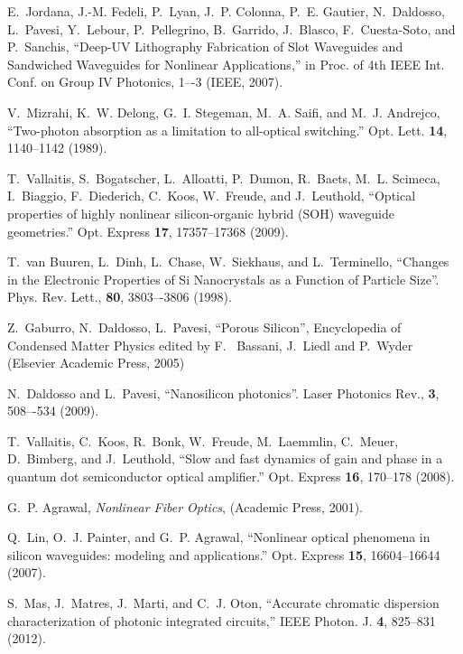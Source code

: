 \documentclass[10pt,letterpaper]{article}
\begin{document}
\begin{thebibliography}{10}
E.~Jordana, J.-M. Fedeli, P.~Lyan, J.~P. Colonna, P.~E. Gautier, N.~Daldosso,
  L.~Pavesi, Y.~Lebour, P.~Pellegrino, B.~Garrido, J.~Blasco, F.~Cuesta-Soto,
  and P.~Sanchis, \enquote{{Deep-UV Lithography Fabrication of Slot Waveguides
  and Sandwiched Waveguides for Nonlinear Applications},} in Proc. of 4th IEEE Int. Conf. on Group IV Photonics, 1–-3 (IEEE, 2007).
  
V.~Mizrahi, K.~W. Delong, G.~I. Stegeman, M.~A. Saifi, and M.~J. Andrejco,
  \enquote{{Two-photon absorption as a limitation to all-optical switching.}}
  Opt. Lett. \textbf{14}, 1140--1142 (1989).

T.~Vallaitis, S.~Bogatscher, L.~Alloatti, P.~Dumon, R.~Baets, M.~L. Scimeca,
  I.~Biaggio, F.~Diederich, C.~Koos, W.~Freude, and J.~Leuthold,
  \enquote{{Optical properties of highly nonlinear silicon-organic hybrid (SOH)
  waveguide geometries.}} Opt. Express \textbf{17}, 17357--17368 (2009).
  
T.~van Buuren, L.~Dinh, L.~Chase, W.~Siekhaus, and L.~Terminello, \enquote{{Changes in the Electronic Properties of Si Nanocrystals as a Function of Particle Size}}. Phys. Rev. Lett., \textbf{80}, 3803–-3806 (1998).

Z.~Gaburro, N.~Daldosso, L.~Pavesi, \enquote{Porous Silicon}, Encyclopedia of Condensed Matter Physics edited by F.~ Bassani, J.~Liedl and P.~Wyder (Elsevier Academic Press, 2005)

N.~Daldosso and L.~Pavesi, \enquote{Nanosilicon photonics}. Laser Photonics Rev., \textbf{3}, 508–-534 (2009).

T.~Vallaitis, C.~Koos, R.~Bonk, W.~Freude, M.~Laemmlin, C.~Meuer, D.~Bimberg,
  and J.~Leuthold, \enquote{{Slow and fast dynamics of gain and phase in a
  quantum dot semiconductor optical amplifier.}} Opt. Express \textbf{16},
  170--178 (2008).

G.~P. Agrawal, \emph{{Nonlinear Fiber Optics}}, (Academic Press, 2001).

Q.~Lin, O.~J. Painter, and G.~P. Agrawal, \enquote{{Nonlinear optical phenomena
  in silicon waveguides: modeling and applications.}} Opt. Express
  \textbf{15}, 16604--16644 (2007).

S.~Mas, J.~Matres, J.~Marti, and C.~J. Oton, \enquote{{Accurate chromatic
  dispersion characterization of photonic integrated circuits},} IEEE Photon. J. \textbf{4}, 825--831 (2012).

\end{thebibliography}
\end{document}
